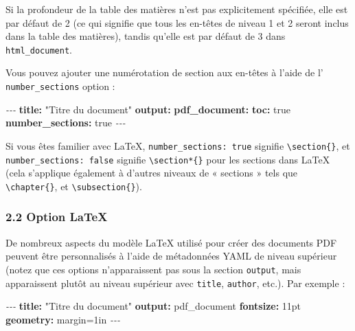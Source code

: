 \documentclass[
]{article}
\newenvironment{Shaded}{\begin{snugshade}}{\end{snugshade}}
\newcommand{\AttributeTok}[1]{\textcolor[rgb]{0.13,0.29,0.53}{#1}}
\newcommand{\CharTok}[1]{\textcolor[rgb]{0.31,0.60,0.02}{#1}}
\newcommand{\FunctionTok}[1]{\textcolor[rgb]{0.13,0.29,0.53}{\textbf{#1}}}
\newcommand{\KeywordTok}[1]{\textcolor[rgb]{0.13,0.29,0.53}{\textbf{#1}}}
\newcommand{\PreprocessorTok}[1]{\textcolor[rgb]{0.56,0.35,0.01}{\textit{#1}}}
\newcommand{\StringTok}[1]{\textcolor[rgb]{0.31,0.60,0.02}{#1}}
\begin{document}
Si la profondeur de la table des matières n'est pas explicitement
spécifiée, elle est par défaut de 2 (ce qui signifie que tous les
en-têtes de niveau 1 et 2 seront inclus dans la table des matières),
tandis qu'elle est par défaut de 3 dans \texttt{html\_document}.

Vous pouvez ajouter une numérotation de section aux en-têtes à l'aide de
l' \texttt{number\_sections} option :

\begin{Shaded}
\begin{Highlighting}[]
\PreprocessorTok{{-}{-}{-}}
\FunctionTok{title}\KeywordTok{:}\AttributeTok{ }\StringTok{"Titre du document"}
\FunctionTok{output}\KeywordTok{:}
\AttributeTok{  }\FunctionTok{pdf\_document}\KeywordTok{:}
\AttributeTok{    }\FunctionTok{toc}\KeywordTok{:}\AttributeTok{ }\CharTok{true}
\AttributeTok{    }\FunctionTok{number\_sections}\KeywordTok{:}\AttributeTok{ }\CharTok{true}
\PreprocessorTok{{-}{-}{-}}
\end{Highlighting}
\end{Shaded}

Si vous êtes familier avec LaTeX, \texttt{number\_sections:\ true}
signifie \texttt{\textbackslash{}section\{\}}, et
\texttt{number\_sections:\ false} signifie
\texttt{\textbackslash{}section*\{\}} pour les sections dans LaTeX (cela
s'applique également à d'autres niveaux de « sections » tels que
\texttt{\textbackslash{}chapter\{\}}, et
\texttt{\textbackslash{}subsection\{\}}).

\hypertarget{option-latex}{%
\subsubsection{2.2 Option LaTeX}\label{option-latex}}

De nombreux aspects du modèle LaTeX utilisé pour créer des documents PDF
peuvent être personnalisés à l'aide de métadonnées YAML de niveau
supérieur (notez que ces options n'apparaissent pas sous la section
\texttt{output}, mais apparaissent plutôt au niveau supérieur avec
\texttt{title}, \texttt{author}, etc.). Par exemple :

\begin{Shaded}
\begin{Highlighting}[]
\PreprocessorTok{{-}{-}{-}}
\FunctionTok{title}\KeywordTok{:}\AttributeTok{ }\StringTok{"Titre du document"}
\FunctionTok{output}\KeywordTok{:}\AttributeTok{ pdf\_document}
\FunctionTok{fontsize}\KeywordTok{:}\AttributeTok{ 11pt}
\FunctionTok{geometry}\KeywordTok{:}\AttributeTok{ margin=1in}
\PreprocessorTok{{-}{-}{-}}
\end{Highlighting}
\end{Shaded}
\end{document}
